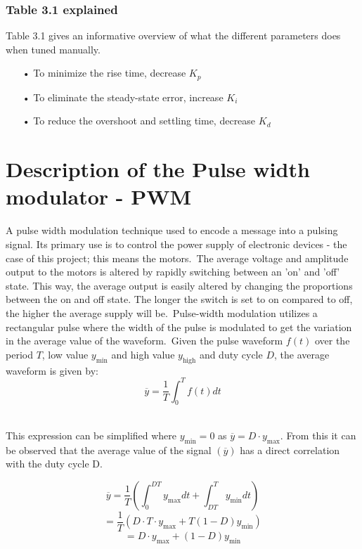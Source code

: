 \subsubsection {Table 3.1 explained}

Table 3.1 gives an informative overview of what the different parameters does when tuned manually.

\begin{enumerate}
		\item[•]To minimize the rise time, decrease $K_p$
		\item[•]To eliminate the steady-state error, increase $K_i$
		\item[•]To reduce the overshoot and settling time, decrease $K_d$
	\end{enumerate}

\section{Description of the Pulse width modulator - PWM}

A pulse width modulation technique used to encode a message into a pulsing signal. Its primary use is to control the power supply of electronic devices - the case of this project; this means the motors.\
The average voltage and amplitude output to the motors is altered by rapidly switching between an 'on' and 'off' state. This way, the average output is easily altered by changing the proportions between the on and off state. The longer the switch is set to on compared to off, the higher the average supply will be.\
Pulse-width modulation utilizes a rectangular pulse where the width of the pulse is modulated to get the variation in the average value of the waveform.\ Given the pulse waveform $f(t)$ over the period $T$, low value $y_\mathrm{min}$ and high value $y_\mathrm{high}$ and duty cycle $D$, the average waveform is given by: \\

$$\overline{y}=\frac{1}{T}\int_{0}^{T}f(t)dt$$\

This expression can be simplified where $y_\mathrm{min}=0$ as $\overline{y}=D \cdot y_\mathrm{max}$. From this it can be observed that the average value of the signal $(\overline{y})$ has a direct correlation with the duty cycle D. 
 
 $$\overline{y}=\frac{1}{T}\left(\int_{0}^{DT}y_\mathrm{max}dt+\int_{DT}^{T}y_\mathrm{min}dt\right)$$
 $$=\frac{1}{T}\left(D \cdot T \cdot y_\mathrm{max}+T(1-D)y_\mathrm{min}\right)$$
 $$=D \cdot y_\mathrm{max}+\left(1-D\right)y_\mathrm{min}$$\
 
